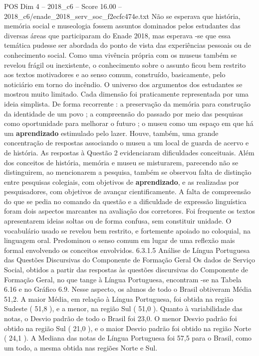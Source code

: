 \begin{textsample}{POS Dim 4 – 2018\_c6 – Score 16.00 – 2018\_c6/enade\_2018\_serv\_soc\_f2ecfc474e.txt}
Não se esperava que história, memória social e museologia fossem assuntos dominados pelos estudantes das diversas áreas que participaram do Enade 2018, mas esperava -se que essa temática pudesse ser abordada do ponto de vista das experiências pessoais ou de conhecimento social.
Como uma vivência própria com os museus também se revelou frágil ou inexistente, o conhecimento sobre o assunto ficou bem restrito aos textos motivadores e ao senso comum, construído, basicamente, pelo noticiário em torno do incêndio.
O universo dos argumentos dos estudantes se mostrou muito limitado.
Cada dimensão foi praticamente representada por uma ideia simplista.
De forma recorrente : a preservação da memória para construção da identidade de um povo ; a compreensão do passado por meio das pesquisas como oportunidade para melhorar o futuro ; o museu como um espaço em que há um \textbf{aprendizado} estimulado pelo lazer.
Houve, também, uma grande concentração de respostas associando o museu a um local de guarda de acervo e de história.
As respostas à Questão 2 evidenciaram dificuldades conceituais.
Além dos conceitos de história, memória e museu se misturarem, parecendo não se distinguirem, ao mencionarem a pesquisa, também se observou falta de distinção entre pesquisas colegiais, com objetivos de \textbf{aprendizado}, e as realizadas por pesquisadores, com objetivos de avançar cientificamente.
A falta de compreensão do que se pedia no comando da questão e a dificuldade de expressão linguística foram dois aspectos marcantes na avaliação dos corretores.
Foi frequente os textos apresentarem ideias soltas ou de forma confusa, sem constituir unidade.
O vocabulário usado se revelou bem restrito, e fortemente apoiado no coloquial, na linguagem oral.
Predominou o senso comum em lugar de uma reflexão mais formal envolvendo os conceitos envolvidos. 6.3.1.5 Análise de Língua Portuguesa das Questões Discursivas do Componente de Formação Geral Os dados de Serviço Social, obtidos a partir das respostas às questões discursivas do Componente de Formação Geral, no que tange à Língua Portuguesa, encontram -se na Tabela 6.16 e no Gráfico 6.9.
Nesse aspecto, os alunos de todo o Brasil obtiveram Média 51,2.
A maior Média, em relação à Língua Portuguesa, foi obtida na região Sudeste ( 51,8 ), e a menor, na região Sul ( 51,0 ).
Quanto à variabilidade das notas, o Desvio padrão de todo o Brasil foi 23,0.
O menor Desvio padrão foi obtido na região Sul ( 21,0 ), e o maior Desvio padrão foi obtido na região Norte ( 24,1 ).
A Mediana das notas de Língua Portuguesa foi 57,5 para o Brasil, como um todo, a mesma obtida nas regiões Norte e Sul.

\end{textsample}
